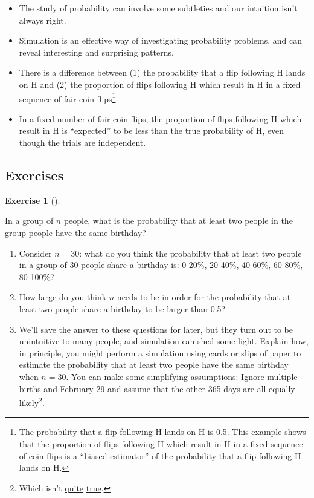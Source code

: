 \documentclass[
  letterpaper,
  DIV=11,
  numbers=noendperiod]{scrreprt}
\providecommand{\tightlist}{%
  \setlength{\itemsep}{0pt}\setlength{\parskip}{0pt}}
\theoremstyle{plain}
\theoremstyle{definition}
\theoremstyle{definition}
\newtheorem{exercise}{Exercise}[chapter]
\theoremstyle{definition}
\theoremstyle{remark}
\begin{document}
\begin{itemize}
\tightlist
\item
  The study of probability can involve some subtleties and our intuition
  isn't always right.
\item
  Simulation is an effective way of investigating probability problems,
  and can reveal interesting and surprising patterns.
\item
  There is a difference between (1) the probability that a flip
  following H lands on H and (2) the proportion of flips following H
  which result in H in a fixed sequence of fair coin flips\footnote{The
    probability that a flip following H lands on H is 0.5. This example
    shows that the proportion of flips following H which result in H in
    a fixed sequence of coin flips is a ``biased estimator'' of the
    probability that a flip following H lands on H.}.
\item
  In a fixed number of fair coin flips, the proportion of flips
  following H which result in H is ``expected'' to be less than the true
  probability of H, even though the trials are independent.
\end{itemize}

\subsection{Exercises}\label{exercises-7}

\begin{exercise}[]\protect\hypertarget{exr-literacy-birthday}{}\label{exr-literacy-birthday}

In a group of \(n\) people, what is the probability that at least two
people in the group people have the same birthday?

\begin{enumerate}
\def\labelenumi{\arabic{enumi}.}
\tightlist
\item
  Consider \(n=30\): what do you think the probability that at least two
  people in a group of 30 people share a birthday is: 0-20\%, 20-40\%,
  40-60\%, 60-80\%, 80-100\%?
\item
  How large do you think \(n\) needs to be in order for the probability
  that at least two people share a birthday to be larger than 0.5?
\item
  We'll save the answer to these questions for later, but they turn out
  to be unintuitive to many people, and simulation can shed some light.
  Explain how, in principle, you might perform a simulation using cards
  or slips of paper to estimate the probability that at least two people
  have the same birthday when \(n=30\). You can make some simplifying
  assumptions: Ignore multiple births and February 29 and assume that
  the other 365 days are all equally likely\footnote{Which isn't
    \href{https://visme.co/blog/most-common-birthday/}{quite}
    \href{http://thedailyviz.com/2016/09/17/how-common-is-your-birthday-dailyviz/}{true}.}.
\end{enumerate}

\end{exercise}
\end{document}
